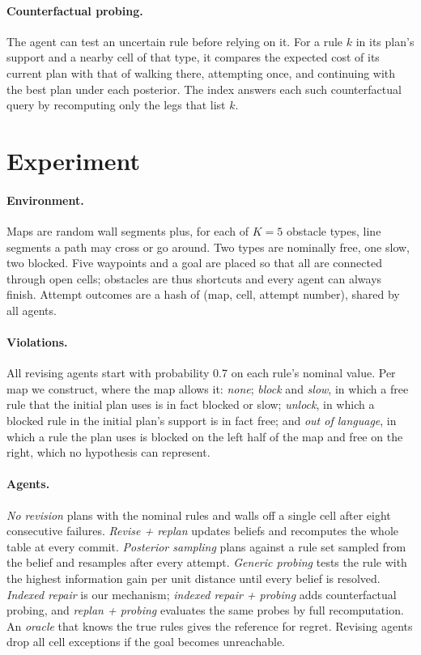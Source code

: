 \documentclass[letterpaper]{article}
\begin{document}
\paragraph{Counterfactual probing.} The agent can test an uncertain rule before relying on it. For a rule $k$ in its plan's support and a nearby cell of that type, it compares the expected cost of its current plan with that of walking there, attempting once, and continuing with the best plan under each posterior. The index answers each such counterfactual query by recomputing only the legs that list $k$.

\section{Experiment}

\paragraph{Environment.} Maps are random wall segments plus, for each of $K{=}5$ obstacle types, line segments a path may cross or go around. Two types are nominally free, one slow, two blocked. Five waypoints and a goal are placed so that all are connected through open cells; obstacles are thus shortcuts and every agent can always finish. Attempt outcomes are a hash of (map, cell, attempt number), shared by all agents.

\paragraph{Violations.} All revising agents start with probability 0.7 on each rule's nominal value. Per map we construct, where the map allows it: \emph{none}; \emph{block} and \emph{slow}, in which a free rule that the initial plan uses is in fact blocked or slow; \emph{unlock}, in which a blocked rule in the initial plan's support is in fact free; and \emph{out of language}, in which a rule the plan uses is blocked on the left half of the map and free on the right, which no hypothesis can represent.

\paragraph{Agents.} \emph{No revision} plans with the nominal rules and walls off a single cell after eight consecutive failures. \emph{Revise + replan} updates beliefs and recomputes the whole table at every commit. \emph{Posterior sampling} \citep{osband2013} plans against a rule set sampled from the belief and resamples after every attempt. \emph{Generic probing} tests the rule with the highest information gain per unit distance until every belief is resolved. \emph{Indexed repair} is our mechanism; \emph{indexed repair + probing} adds counterfactual probing, and \emph{replan + probing} evaluates the same probes by full recomputation. An \emph{oracle} that knows the true rules gives the reference for regret. Revising agents drop all cell exceptions if the goal becomes unreachable.
\end{document}
